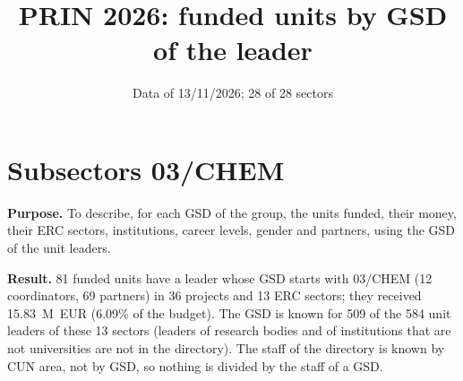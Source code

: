 \documentclass[11pt,a4paper]{article}
\title{PRIN 2026: funded units by GSD of the leader}
\author{}
\date{Data of 13/11/2026; 28 of 28 sectors}
\begin{document}
\maketitle
\section{Subsectors 03/CHEM}
\textbf{Purpose.} To describe, for each GSD of the group, the units funded, their money, their ERC sectors, institutions, career levels, gender and partners, using the GSD of the unit leaders.

\textbf{Result.} 81 funded units have a leader whose GSD starts with 03/CHEM (12 coordinators, 69 partners) in 36 projects and 13 ERC sectors; they received 15.83~M~EUR (6.09\% of the budget). The GSD is known for 509 of the 584 unit leaders of these 13 sectors (leaders of research bodies and of institutions that are not universities are not in the directory). The staff of the directory is known by CUN area, not by GSD, so nothing is divided by the staff of a GSD.
\end{document}
